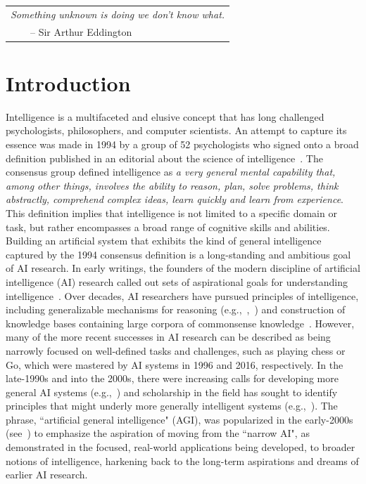 \begin{flushright}
\begin{tabular}{l}
{\em Something unknown is doing we don't know what.}\\
\ \ \ \ -- Sir Arthur Eddington
\end{tabular}
\end{flushright}

\section{Introduction}
\label{sec:intro}   

Intelligence is a multifaceted and elusive concept that has long challenged psychologists, philosophers, and computer scientists.
An attempt to capture its essence was made in 1994 by a group of 52 psychologists who signed onto a broad definition published in an editorial about the science of intelligence~\cite{gottfredson1997mainstream}.
The consensus group defined intelligence as {\em a very general mental capability that, among other things, involves the ability to reason, plan, solve problems, think abstractly, comprehend complex ideas, learn quickly and learn from experience}.
This definition implies that intelligence is not limited to a specific domain or task, but rather encompasses a broad range of cognitive skills and abilities.
Building an artificial system that exhibits the kind of general intelligence captured by the 1994 consensus definition is a long-standing and ambitious goal of AI research.
In early writings, the founders of the modern discipline of artificial intelligence (AI) research called out sets of aspirational goals for understanding intelligence~\cite{mccarthy2006proposal}.
Over decades, AI researchers have pursued principles of intelligence, including generalizable mechanisms for reasoning (e.g.,~\cite{newellshawsimonGPS1959},~\cite{lindsay1993dendral}) and construction of knowledge bases containing large corpora of commonsense knowledge~\cite{lenat1995cyc}.
However, many of the more recent successes in AI research can be described as being narrowly focused on well-defined tasks and challenges, such as playing chess or Go, which were mastered by AI systems in 1996 and 2016, respectively. In the late-1990s and into the 2000s, there were increasing calls for developing more general AI systems (e.g.,~\cite{selman1996challenge}) and scholarship in the field has sought to identify principles that might underly more generally intelligent systems (e.g.,~\cite{legg2008machine, gershman2015computational}). The phrase, ``artificial general intelligence" (AGI), was popularized in the early-2000s (see~\cite{goertzel2014artificial}) to emphasize the aspiration of moving from the ``narrow AI", as demonstrated in the focused, real-world applications being developed, to broader notions of intelligence, harkening back to the long-term aspirations and dreams of earlier AI research.
